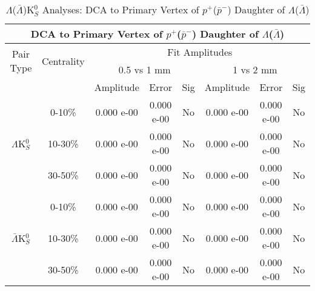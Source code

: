 \documentclass[../AnalysisNoteJBuxton.tex]{subfiles}
\begin{document}
\begin{table}
 \centering
 \begin{tabular}{|c|c|c|c|c||c|c|c|}
  \multicolumn{8}{c}{DCA to Primary Vertex of $p^{+}$($\bar{p}^{-}$) Daughter of $\Lambda$($\bar{\Lambda}$)} \\
  \hline
  \multirow{2}{*}{Pair Type} & \multirow{2}{*}{Centrality} & \multicolumn{6}{c|}{Fit Amplitudes} \\
  \cline{3-8}
   & & \multicolumn{3}{c||}{0.5 vs 1 mm} & \multicolumn{3}{c|}{1 vs 2 mm} \\
  \hline
   & & Amplitude & Error & Sig & Amplitude & Error & Sig \\
  \hline  
  \multirow{3}{*}{$\Lambda$K$^{0}_{S}$}  
   &  0-10\% & 0.000 e-00 & 0.000 e-00 & No & 0.000 e-00 & 0.000 e-00 & No \\
   & 10-30\% & 0.000 e-00 & 0.000 e-00 & No & 0.000 e-00 & 0.000 e-00 & No \\
   & 30-50\% & 0.000 e-00 & 0.000 e-00 & No & 0.000 e-00 & 0.000 e-00 & No \\
  \hline  
  \multirow{3}{*}{$\bar{\Lambda}$K$^{0}_{S}$}  
   &  0-10\% & 0.000 e-00 & 0.000 e-00 & No & 0.000 e-00 & 0.000 e-00 & No \\
   & 10-30\% & 0.000 e-00 & 0.000 e-00 & No & 0.000 e-00 & 0.000 e-00 & No \\
   & 30-50\% & 0.000 e-00 & 0.000 e-00 & No & 0.000 e-00 & 0.000 e-00 & No \\
  \hline
 \end{tabular}
 \caption{$\Lambda$($\bar{\Lambda}$)K$^{0}_{S}$ Analyses: DCA to Primary Vertex of $p^{+}$($\bar{p}^{-}$) Daughter of $\Lambda$($\bar{\Lambda}$)}
 \label{tab:DcaToPrimVertexProtonDaughtOfLamLamK0}
\end{table}
\end{document}
